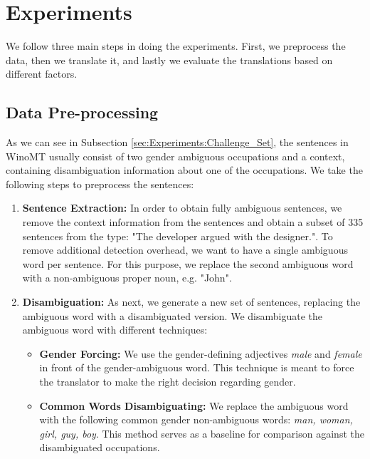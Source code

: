 \chapter{Experiments}
\label{ch:Experiments}


We follow three main steps in doing the experiments. First, we preprocess the data, then we translate it, and lastly we evaluate the translations based on different factors.

\section{Data Pre-processing}

As we can see in Subsection \ref{sec:Experiments:Challenge_Set}, the sentences in WinoMT usually consist of two gender ambiguous occupations and a context, containing disambiguation information about one of the occupations. We take the following steps to preprocess the sentences:

\begin{enumerate}
  \item \textbf{Sentence Extraction:}  
  In order to obtain fully ambiguous sentences, we remove the context information from the sentences and obtain a subset of 335 sentences from the type: "The developer argued with the designer.".
  To remove additional detection overhead, we want to have a single ambiguous word per sentence. For this purpose, we replace the second ambiguous word with a non-ambiguous proper noun, e.g. "John". 
  \item \textbf{Disambiguation:} 
  As next, we generate a new set of sentences, replacing the ambiguous word with a disambiguated version. We disambiguate the ambiguous word with different techniques:
  \begin{itemize}
      \item \textbf{Gender Forcing:} We use the gender-defining adjectives \textit{male} and \textit{female} in front of the gender-ambiguous word. This technique is meant to force the translator to make the right decision regarding gender.
      \item \textbf{Common Words Disambiguating:} We replace the ambiguous word with the following common gender non-ambiguous words: \textit{man, woman, girl, guy, boy}. This method serves as a baseline for comparison against the disambiguated occupations.
  \end{itemize}
\end{enumerate}

